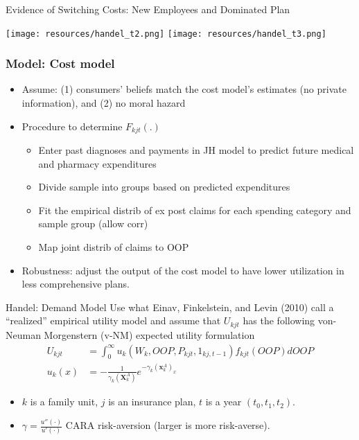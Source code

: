 \begin{frame}{Evidence of Switching Costs: New Employees and Dominated Plan}
\begin{center}
\texttt{[image: resources/handel\_t2.png]}
\texttt{[image: resources/handel\_t3.png]}
\end{center}
\end{frame}


\begin{frame}
\frametitle{Model: Cost model}

\begin{itemize}
\item Assume: (1) consumers' beliefs match the cost model's estimates (no private information), and (2) no moral hazard

\item Procedure to determine $F_{kjt}(.)$
\begin{itemize}
\item Enter past diagnoses and payments in JH model to predict future medical and pharmacy expenditures
\item Divide sample into groups based on predicted expenditures
\item Fit the empirical distrib of ex post claims for each spending category and sample group (allow corr)
\item Map joint distrib of claims to OOP
\end{itemize}

\item Robustness: adjust the output of the cost model to have lower
utilization in less comprehensive plans.

\end{itemize}
\end{frame}



\begin{frame}{Handel: Demand Model}
Use what Einav, Finkelstein, and Levin (2010) call a ``realized'' empirical utility model and assume that $U_{kjt}$ has the following von-Neuman Morgenstern (v-NM) expected utility formulation
\begin{align*}
U_{k j t}&=\int_{0}^{\infty}  u_{k}\left(W_{k}, O O P, P_{k j t}, 1_{k j, t-1}\right) f_{k j t}(O O P) d O O P\\
u_{k}(x)&=-\frac{1}{\gamma_{k}\left(\symbf{X}_{k}^{A}\right)} e^{-\gamma_{k}\left(\symbf{x}_{k}^{A}\right)_{x}}
\end{align*}
\begin{itemize}
\item $k$ is a family unit,  $j$ is an insurance plan,  $t$ is a year $(t_0,t_1,t_2)$.
\item $\gamma = \frac{u''(\cdot) }{u'(\cdot)}$ CARA risk-aversion (larger is more risk-averse).
\end{itemize}
\end{frame}


